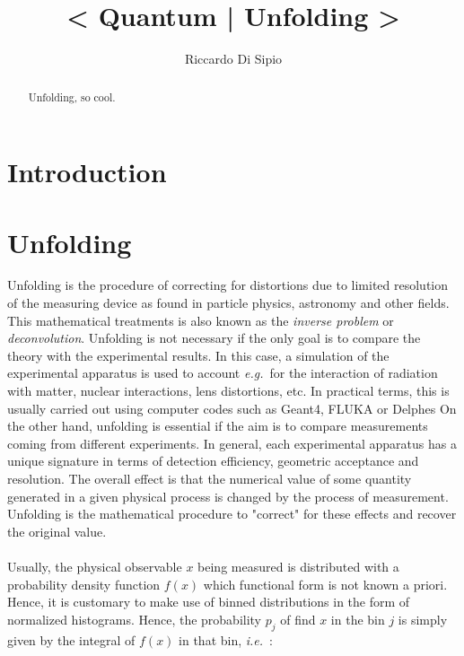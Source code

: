 \documentclass{article}
\begin{document}
\newcommand{\ie}{{\sl i.e.}~}
\newcommand{\eg}{{\sl e.g.}~}


\title{\left < {\rm Quantum} |  {\rm Unfolding} \right >}

\author{Riccardo Di Sipio}

\maketitle

\begin{abstract}
Unfolding, so cool.
\end{abstract}

\section{Introduction}

\section{Unfolding}
Unfolding is the procedure of correcting for distortions due to limited resolution of the measuring device\cite{cowan} as found in particle physics\cite{atlas_unf,cms_unf}, astronomy\cite{astro_unf} and other fields. This mathematical treatments is also known as the {\sl inverse problem} or {\sl deconvolution}. Unfolding is not necessary if the only goal is to compare the theory with the experimental results. In this case, a simulation of the experimental apparatus is used to account \eg for the interaction of radiation with matter, nuclear interactions, lens distortions, etc. In practical terms, this is usually carried out using computer codes such as Geant4\cite{Geant4}, FLUKA\cite{FLUKA} or Delphes\cite{Delphes} On the other hand, unfolding is essential if the aim is to compare measurements coming from different experiments. In general, each experimental apparatus has a unique signature in terms of detection efficiency, geometric acceptance and resolution. The overall effect is that the numerical value of some quantity generated in a given physical process is changed by the process of measurement. Unfolding is the mathematical procedure to "correct" for these effects and recover the original value.

\paragraph{}
Usually, the physical observable $x$ being measured is distributed with a probability density function $f(x)$ which functional form is not known a priori. Hence, it is customary to make use of binned distributions in the form of normalized histograms. Hence, the probability $p_j$ of find $x$ in the bin $j$ is simply given by the integral of $f(x)$ in that bin, \ie:
\end{document}
